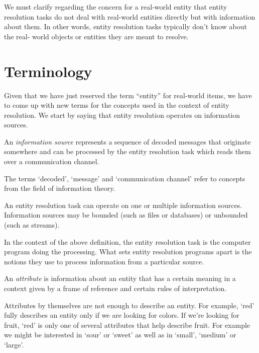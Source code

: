 \documentclass[11pt]{article}
\begin{document}
    We must clarify regarding the concern for a real-world entity that entity
    resolution tasks do not deal with real-world entities directly but with
    information about them\cite{Tal11}.
    In other words, entity resolution tasks typically don't know about the real-
    world objects or entities they are meant to resolve\cite{Chen09}.

    \section{Terminology}\label{sec:terminology}

    Given that we have just reserved the term ``entity'' for real-world items,
    we have to come up with new terms for the concepts used in the context of
    entity resolution.
    We start by saying that entity resolution operates on information sources.

    \begin{defn}
        An \textit{information source} represents a sequence of decoded messages
        that originate somewhere and can be processed by the entity resolution
        task which reads them over a communication channel.
    \end{defn}

    The terms `decoded', `message' and `communication channel' refer to concepts
    from the field of information theory\cite{ash2012it}.
    
    An entity resolution task can operate on one or multiple information
    sources.
    Information sources may be bounded (such as files or databases) or unbounded
    (such as streams).
    
    In the context of the above definition, the entity resolution task is the
    computer program doing the processing.
    What sets entity resolution programs apart is the notions they use to
    process information from a particular source.

    \begin{defn}
        An \textit{attribute} is information about an entity that has a certain
        meaning in a context given by a frame of reference and certain rules of
        interpretation.
    \end{defn}

    Attributes by themselves are not enough to describe an entity.
    For example, `red' fully describes an entity only if we are looking for
    colors.
    If we're looking for fruit, `red' is only one of several attributes that
    help describe fruit.
    For example we might be interested in `sour' or `sweet' as well as in
    `small', `medium' or `large'.
\end{document}

